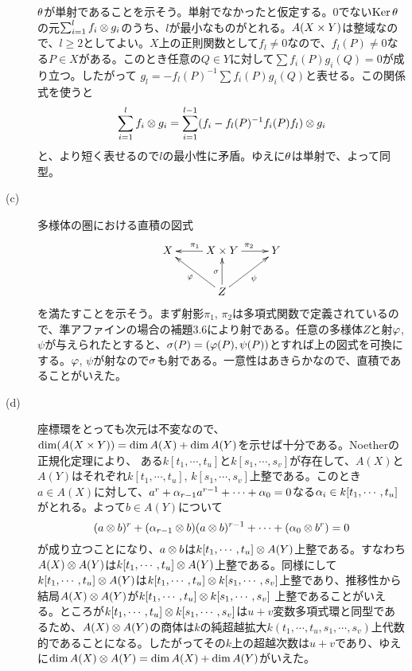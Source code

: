 \begin{description}
  ${\theta}$が単射であることを示そう。単射でなかったと仮定する。$0$でない$\operatorname{Ker} {\theta}$の元$\sum_{i=1}^l f_i \otimes g_i$のうち、$l$が最小なものがとれる。$A(X \times Y)$は整域なので、$l \geq 2$としてよい。$X$上の正則関数として$f_l \neq 0$なので、$f_l(P) \neq 0$なる$P \in X$がある。このとき任意の$Q \in Y$に対して$\sum f_i(P)g_i(Q) = 0$が成り立つ。したがって
  $g_l = - f_l(P)^{-1} \sum f_i(P)g_i(Q)$と表せる。この関係式を使うと
  \[
  \sum_{i=1}^l f_i \otimes g_i = \sum_{i=1}^{l-1} (f_i - f_l(P)^{-1} f_i(P)f_l) \otimes g_i
  \]
  と、より短く表せるので$l$の最小性に矛盾。ゆえに${\theta}$は単射で、よって同型。
  \item[(c)] 多様体の圏における直積の図式
  \[
  \xymatrix{
  X & X \tm Y \ar[l]_{\pi_1} \ar[r]^{\pi_2} & Y \\
  {} & Z \ar[ul]^{\vp} \ar[ur]_{\psi} \ar[u]^{\grs} & {}
  }
  \]
  を満たすことを示そう。まず射影$\pi_1$, $\pi_2$は多項式関数で定義されているので、準アファインの場合の補題3.6により射である。任意の多様体$Z$と射${\varphi}$, $\psi$が与えられたとすると、${\sigma}(P) = ({\varphi}(P), \psi(P))$とすれば上の図式を可換にする。${\varphi}$, $\psi$が射なので${\sigma}$も射である。一意性はあきらかなので、直積であることがいえた。
  \item[(d)] 座標環をとっても次元は不変なので、$\dim(A(X \times Y)) = \dim A(X) + \dim A(Y)$を示せば十分である。Noetherの正規化定理により、
  ある$k[t_1, \cdots , t_u]$と$k[s_1, \cdots , s_v]$が存在して、$A(X)$と$A(Y)$はそれぞれ$k[t_1, \cdots , t_u]$, $k[s_1, \cdots , s_v]$上整である。このとき$a \in A(X)$に対して、$a^r + {\alpha}_{r-1}a^{r-1} + \cdots + {\alpha}_0 = 0$なる${\alpha}_i \in k[t_1, \cdots , t_u]$
  がとれる。よって$b \in A(Y)$について
  \[
  (a \otimes b)^r + ({\alpha}_{r-1} \otimes b)(a \otimes b)^{r-1} + \cdots + ({\alpha}_0 \otimes b^r) = 0
  \]
  が成り立つことになり、$a \otimes b$は$k[t_1, \cdots , t_u] \otimes A(Y)$上整である。すなわち$A(X) \otimes A(Y)$は$k[t_1, \cdots , t_u] \otimes A(Y)$上整である。同様にして$k[t_1, \cdots , t_u] \otimes A(Y)$は$k[t_1, \cdots , t_u] \otimes k[s_1, \cdots , s_v]$上整であり、推移性から結局$A(X) \otimes A(Y)$が$k[t_1, \cdots , t_u] \otimes k[s_1, \cdots , s_v]$
  上整であることがいえる。ところが$k[t_1, \cdots , t_u] \otimes k[s_1, \cdots , s_v]$は$u +v$変数多項式環と同型であるため、$A(X) \otimes A(Y)$の商体は$k$の純超越拡大$k(t_1,  \cdots , t_u , s_1, \cdots , s_v)$上代数的であることになる。したがってその$k$上の超越次数は$u+v$であり、ゆえに$\dim A(X) \otimes A(Y) = \dim A(X) + \dim A(Y)$がいえた。
\end{description}







